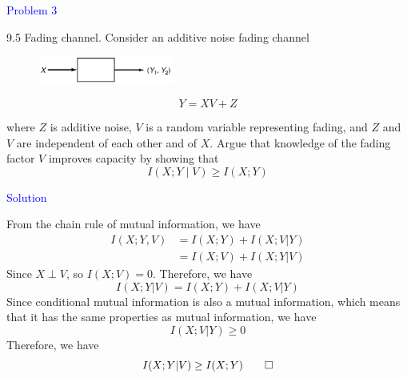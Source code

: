 \textcolor{blue}{Problem 3}

9.5 Fading channel. Consider an additive noise fading channel
\begin{figure}[htbp]
    \centering
	\includegraphics[width=0.4\textwidth]{../figure/9_1_9_2.png}
\end{figure}
$$ Y =XV + Z$$

where $Z$ is additive noise, $V$ is a random variable representing fading, and $Z$ and $V$ are independent of each other and of $X$. Argue that knowledge of the fading factor $V$ improves capacity by showing that
$$I(X ; Y \mid V) \geq I(X ; Y)$$

\textcolor{blue}{Solution}

From the chain rule of mutual information, we have
\begin{align*}
I(X;Y,V) &= I(X;Y) + I(X;V|Y) \\
&= I(X;V) + I(X;Y|V)
\end{align*}
Since $X\perp V$, so $I(X;V) = 0$. Therefore, we have
$$I(X;Y|V) = I(X;Y) + I(X;V|Y)$$
Since conditional mutual information is also a mutual information, which means that it has the same properties as mutual information, we have
$$I(X;V|Y)\geq 0$$
Therefore, we have
$$I(X;Y|V) \geq I(X;Y)\qed$$

\newpage